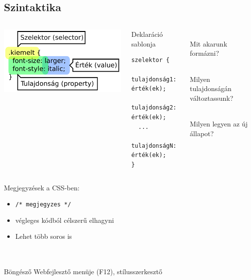 \subsection{Szintaktika}

\begin{frame}[fragile]
  \begin{columns}[c]
      \includegraphics[scale=0.75]{szintakszis.pdf}\\
      \begin{block}{Deklaráció sablonja}
      \vspace{-0.5cm}
\begin{verbatim}
szelektor {
  tulajdonság1: érték(ek);
  tulajdonság2: érték(ek);
  ...
  tulajdonságN: érték(ek);
}
\end{verbatim}
      \vspace{-0.4cm}
      \end{block}
      \begin{description}[m]
        \item[Szelektor] \hfill \\ Mit akarunk formázni?
        \item[Tulajdonság] \hfill \\ Milyen tulajdonságán változtassunk?
        \item[Érték] \hfill \\ Milyen legyen az új állapot?
      \end{description}
  \end{columns}
  
\end{frame}

\begin{frame}
  Megjegyzések a CSS-ben:
  \begin{itemize}
    \item \texttt{/* megjegyzes */}
    \item végleges kódból célszerű elhagyni
    \item Lehet több soros is
  \end{itemize} 
  \\
  \\
  Böngésző Webfejlesztő menüje (F12), stílusszerkesztő
\end{frame}
